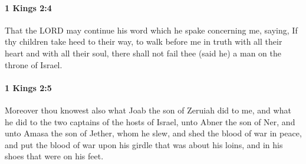 		\paragraph{1 Kings 2:4} %
			\label{1KINGS-2-4}

			That the LORD may continue his word which he spake concerning me, saying, If thy children take heed to their way, to walk before me in truth with all their heart and with all their soul, there shall not fail thee (said he) a man on the throne of Israel.


		\paragraph{1 Kings 2:5} %
			\label{1KINGS-2-5}

			Moreover thou knowest also what Joab the son of Zeruiah did to me, and what he did to the two captains of the hosts of Israel, unto Abner the son of Ner, and unto Amasa the son of Jether, whom he slew, and shed the blood of war in peace, and put the blood of war upon his girdle that was about his loins, and in his shoes that were on his feet.

